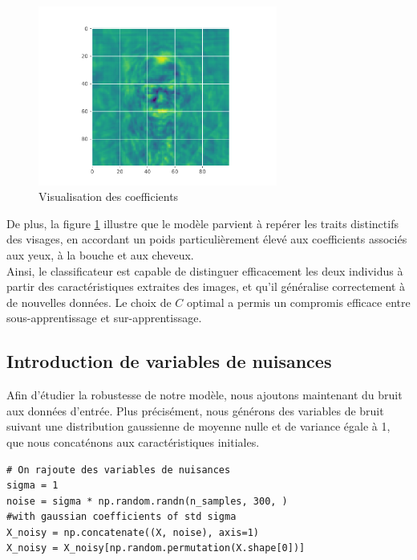 \documentclass[a4paper,12pt]{article}
\begin{document}
\begin{figure}[H] 
    \centering
    \includegraphics[width=0.7\textwidth]{images/coeffs.pdf} 
    \caption{Visualisation des coefficients}
    \label{fig:coeffs}
\end{figure}

De plus, la figure \ref{fig:coeffs} illustre que le modèle parvient à repérer les traits distinctifs des visages, en accordant un poids particulièrement élevé aux coefficients associés aux yeux, à la bouche et aux cheveux.\\
 
Ainsi, le classificateur est capable de distinguer efficacement les deux individus à partir des caractéristiques extraites des images, et qu’il généralise correctement à de nouvelles données. Le choix de $C$ optimal a permis un compromis efficace entre sous-apprentissage et sur-apprentissage.

\subsection{Introduction de variables de nuisances}

Afin d’étudier la robustesse de notre modèle, nous ajoutons maintenant du bruit aux données d’entrée. 
Plus précisément, nous générons des variables de bruit suivant une distribution gaussienne de moyenne nulle et de variance égale à 1, 
que nous concaténons aux caractéristiques initiales. 

\begin{verbatim}
# On rajoute des variables de nuisances
sigma = 1
noise = sigma * np.random.randn(n_samples, 300, ) 
#with gaussian coefficients of std sigma
X_noisy = np.concatenate((X, noise), axis=1)
X_noisy = X_noisy[np.random.permutation(X.shape[0])]
\end{verbatim}
\end{document}

